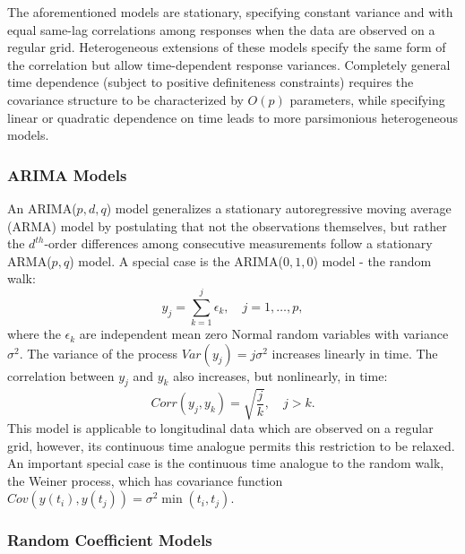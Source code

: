 \bigskip

The aforementioned models are stationary, specifying constant variance and with equal same-lag correlations among responses when the data are observed on a regular grid. Heterogeneous extensions of these models specify the same form of the correlation but allow time-dependent response variances. Completely general time dependence (subject to positive definiteness constraints) requires the covariance structure to be characterized by $O(p)$ parameters, while specifying linear or quadratic dependence on time leads to more parsimonious heterogeneous models. 

\subsubsection{ARIMA Models}

An ARIMA($p,d,q$) model generalizes a stationary autoregressive moving average (ARMA) model by postulating that not the observations themselves, but rather the $d^{th}$-order differences among consecutive measurements follow a stationary ARMA($p,q$) model. A special case is the ARIMA($0,1,0$) model - the random walk:
\begin{equation}
y_{j}  =   \sum_{k = 1}^j \epsilon_{k}, \quad j = 1, \dots, p,
\end{equation}
\noindent
where the $\epsilon_{k}$ are independent mean zero Normal random variables with variance $\sigma^2$. The variance of the process $Var\left(y_j\right) = j\sigma^2$ increases linearly in time. The correlation between $y_{j}$ and $y_{k}$ also increases, but nonlinearly, in time:
\[
Corr\left(y_{j},y_{k}\right) = \sqrt{\frac{{j}}{{k}}}, \quad j > k.
\]
\noindent
This model is applicable to longitudinal data which are observed on a regular grid, however, its continuous time analogue permits this restriction to be relaxed. An important special case is the continuous time analogue to the random walk, the Weiner process, which has covariance function $Cov\left(y\left(t_i\right), y\left(t_j\right)\right) = \sigma^2 \min\left(t_i, t_j\right)$.

\subsubsection{Random Coefficient Models}

